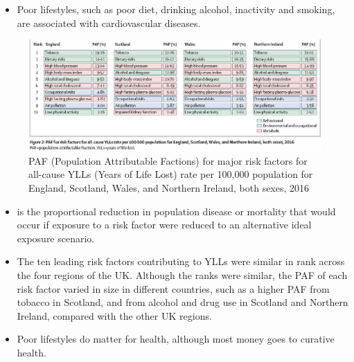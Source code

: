 \begin{itemize}           
        \item Poor lifestyles, such as poor diet, drinking alcohol, inactivity and smoking, are associated with cardiovascular diseases.
        \end{itemize}

\begin{figure}[H]%
                \centering
                \includegraphics[width=5in]{images/ch3/17.png}
                \caption{PAF (Population Attributable Factions) for major risk factors for all-cause YLLs (Years of Life Lost) rate per 100,000 population for England, Scotland, Wales, and Northern Ireland, both sexes, 2016}
            \end{figure} 

\begin{itemize}           
        \item {} is the proportional reduction in population disease or mortality that would occur if exposure to a risk factor were reduced to an alternative ideal exposure scenario. 
        \item The ten leading risk factors contributing to YLLs were similar in rank across the four regions of the UK. Although the ranks were similar, the PAF of each risk factor varied in size in different countries, such as a higher PAF from tobacco in Scotland, and from alcohol and drug use in Scotland and Northern Ireland, compared with the other UK regions.
        \item Poor lifestyles do matter for health, although most money goes to curative health.
        \end{itemize}

